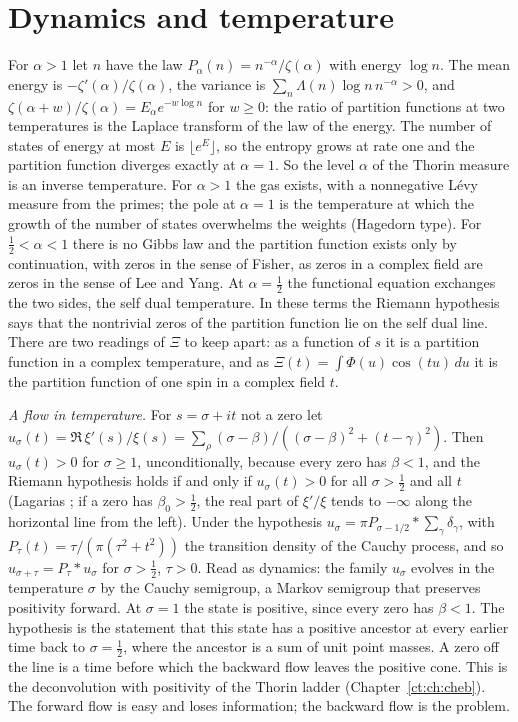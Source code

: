 \section{Dynamics and temperature}\label{lvz:sec:dyn}

For $\alpha>1$ let $n$ have the law $P_\alpha(n)=n^{-\alpha}/\zeta(\alpha)$ with energy $\log n$. The mean energy is $-\zeta'(\alpha)/\zeta(\alpha)$, the variance is $\sum_n\Lambda(n)\log n\,n^{-\alpha}>0$, and $\zeta(\alpha+w)/\zeta(\alpha)=E_\alpha e^{-w\log n}$ for $w\ge0$: the ratio of partition functions at two temperatures is the Laplace transform of the law of the energy. The number of states of energy at most $E$ is $\lfloor e^E\rfloor$, so the entropy grows at rate one and the partition function diverges exactly at $\alpha=1$. So the level $\alpha$ of the Thorin measure is an inverse temperature. For $\alpha>1$ the gas exists, with a nonnegative L\'evy measure from the primes; the pole at $\alpha=1$ is the temperature at which the growth of the number of states overwhelms the weights (Hagedorn type). For $\frac12<\alpha<1$ there is no Gibbs law and the partition function exists only by continuation, with zeros in the sense of Fisher, as zeros in a complex field are zeros in the sense of Lee and Yang. At $\alpha=\frac12$ the functional equation exchanges the two sides, the self dual temperature.
In these terms the Riemann hypothesis says that the nontrivial zeros of the partition function lie on the self dual line. There are two readings of $\Xi$ to keep apart: as a function of $s$ it is a partition function in a complex temperature, and as $\Xi(t)=\int\Phi(u)\cos(tu)\,du$ it is the partition function of one spin in a complex field $t$.

\emph{A flow in temperature.} For $s=\sigma+it$ not a zero let $u_\sigma(t)=\Re\,\xi'(s)/\xi(s)=\sum_\rho(\sigma-\beta)/((\sigma-\beta)^2+(t-\gamma)^2)$. Then $u_\sigma(t)>0$ for $\sigma\ge1$, unconditionally, because every zero has $\beta<1$, and the Riemann hypothesis holds if and only if $u_\sigma(t)>0$ for all $\sigma>\frac12$ and all $t$ (Lagarias \cite{Lagarias}; if a zero has $\beta_0>\frac12$, the real part of $\xi'/\xi$ tends to $-\infty$ along the horizontal line from the left). Under the hypothesis $u_\sigma=\pi P_{\sigma-1/2}*\sum_\gamma\delta_\gamma$, with $P_\tau(t)=\tau/(\pi(\tau^2+t^2))$ the transition density of the Cauchy process, and so $u_{\sigma+\tau}=P_\tau*u_\sigma$ for $\sigma>\frac12$, $\tau>0$. Read as dynamics: the family $u_\sigma$ evolves in the temperature $\sigma$ by the Cauchy semigroup, a Markov semigroup that preserves positivity forward. At $\sigma=1$ the state is positive, since every zero has $\beta<1$. The hypothesis is the statement that this state has a positive ancestor at every earlier time back to $\sigma=\frac12$, where the ancestor is a sum of unit point masses. A zero off the line is a time before which the backward flow leaves the positive cone. This is the deconvolution with positivity of the Thorin ladder (Chapter~\ref{ct:ch:cheb}). The forward flow is easy and loses information; the backward flow is the problem.

